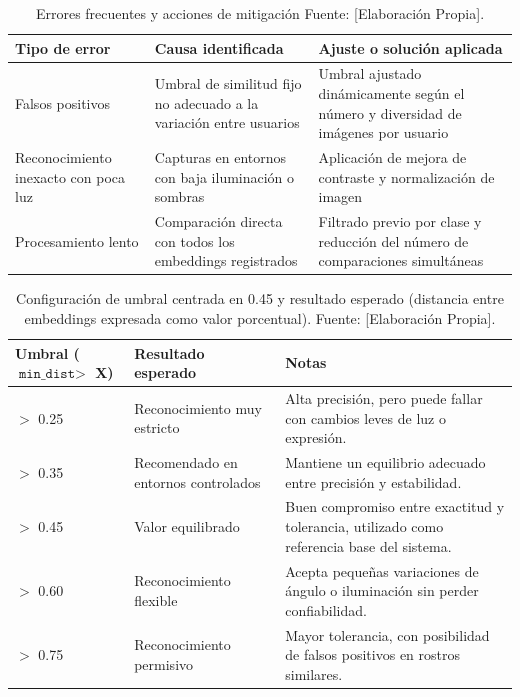 \begin{table}
    \centering
    \caption{Errores frecuentes y acciones de mitigación Fuente: [Elaboración Propia].}
    \label{tab:errores_ajustes}
    \renewcommand{\arraystretch}{1.3}
    \begin{tabular}{|p{3.5cm}|p{4cm}|p{4.9cm}|}
        \hline
        \textbf{Tipo de error} & \textbf{Causa identificada} & \textbf{Ajuste o solución aplicada} \\ \hline

        Falsos positivos & Umbral de similitud fijo no adecuado a la variación entre usuarios & Umbral ajustado dinámicamente según el número y diversidad de imágenes por usuario \\ \hline

        Reconocimiento inexacto con poca luz & Capturas en entornos con baja iluminación o sombras & Aplicación de mejora de contraste y normalización de imagen \\ \hline

        Procesamiento lento & Comparación directa con todos los embeddings registrados & Filtrado previo por clase y reducción del número de comparaciones simultáneas \\ \hline
    \end{tabular}
\end{table}


\begin{table}[H]
\centering
\caption{Configuración de umbral centrada en 0.45 y resultado esperado (distancia entre embeddings expresada como valor porcentual). Fuente: [Elaboración Propia].}
\label{tab:umbral_045}
\renewcommand{\arraystretch}{1.3}
\begin{tabular}{|p{2.3cm}|p{5cm}|p{5cm}|}
\hline
\textbf{Umbral ($\texttt{min\_dist} >$ X)} & \textbf{Resultado esperado} & \textbf{Notas} \\ \hline

$>$ 0.25 & Reconocimiento muy estricto & Alta precisión, pero puede fallar con cambios leves de luz o expresión. \\ \hline

$>$ 0.35 & Recomendado en entornos controlados & Mantiene un equilibrio adecuado entre precisión y estabilidad. \\ \hline

$>$ 0.45 & Valor equilibrado & Buen compromiso entre exactitud y tolerancia, utilizado como referencia base del sistema. \\ \hline

$>$ 0.60 & Reconocimiento flexible & Acepta pequeñas variaciones de ángulo o iluminación sin perder confiabilidad. \\ \hline

$>$ 0.75 & Reconocimiento permisivo & Mayor tolerancia, con posibilidad de falsos positivos en rostros similares. \\ \hline
\end{tabular}
\end{table}





